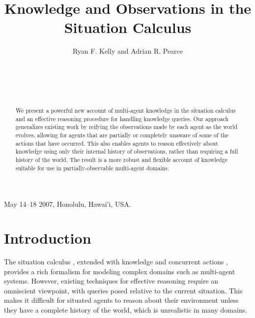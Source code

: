 \documentclass{ifaamas-submission}
\begin{document}
 {May 14--18 2007, Honolulu, Hawai'i, USA.}

\title{Knowledge and Observations in the Situation Calculus}


\author{
\alignauthor
Ryan F. Kelly and Adrian R. Pearce\\
\\
\\
\\
\\
}

\maketitle

\begin{abstract}
We present a powerful new account of multi-agent knowledge in the
situation calculus and an effective reasoning procedure for handling
knowledge queries. Our approach generalizes existing work by reifying
the observations made by each agent as the world evolves, allowing
for agents that are partially or completely unaware of some of the
actions that have occurred. This also enables agents to reason effectively
about knowledge using only their internal history of observations,
rather than requiring a full history of the world. The result is a
more robust and flexible account of knowledge suitable for use in
partially-observable multi-agent domains. 
\end{abstract}




\section{Introduction}

The situation calculus \cite{pirri99contributions_sitcalc},
 extended with knowledge \cite{scherl03sc_knowledge} and concurrent actions
\cite{scherl03conc_knowledge}, provides a rich formalism for modeling complex
domains such as multi-agent systems.  However, existing techniques for
effective reasoning require an omniscient viewpoint, with queries posed
relative to the current situation.
This makes it difficult for situated agents to reason about their environment
unless they have a complete history of the world, which is unrealistic in many domains.
\end{document}
